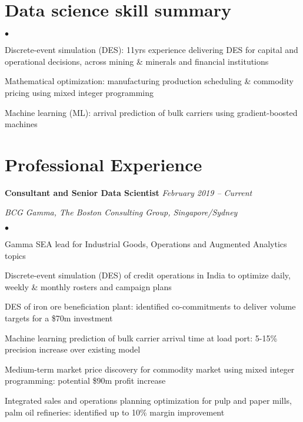 \documentclass[margin,line]{resume}
\newenvironment{list1}{
  \begin{list}{}{%
      \setlength{\itemsep}{0in}
      \setlength{\parsep}{0in} \setlength{\parskip}{0in}
      \setlength{\topsep}{0in} \setlength{\partopsep}{0in}
      \setlength{\leftmargin}{0.17in}}}{\end{list}}
\newenvironment{list2}{
  \begin{list}{$\bullet$}{%
      \setlength{\itemsep}{0in}
      \setlength{\parsep}{0in} \setlength{\parskip}{0in}
      \setlength{\topsep}{0in} \setlength{\partopsep}{0in}
      \setlength{\leftmargin}{0.2in}}}{\end{list}}
\begin{document}
\begin{resume}
\section{\sc Data science skill summary}
\begin{list2}
\item Discrete-event simulation (DES): 11yrs experience delivering DES for capital and operational decisions, across mining \& minerals and financial institutions
\item Mathematical optimization: manufacturing production scheduling \& commodity pricing using mixed integer programming
\item Machine learning (ML): arrival prediction of bulk carriers using gradient-boosted machines
\end{list2}

\section{\sc Professional Experience}
{\textbf{Consultant and Senior Data Scientist}} \hfill {\it February 2019 -- Current}\\
\vspace{-0.85\baselineskip}
\begin{list1}
\item {\it BCG Gamma, The Boston Consulting Group, Singapore/Sydney}
\begin{list2}
\item Gamma SEA lead for Industrial Goods, Operations and Augmented Analytics topics
\item Discrete-event simulation (DES) of credit operations in India to optimize daily, weekly \& monthly rosters and campaign plans
\item DES of iron ore beneficiation plant: identified co-commitments to deliver volume targets for a \$70m investment 
\item Machine learning prediction of bulk carrier arrival time at load port: 5-15\% precision increase over existing model
\item Medium-term market price discovery for commodity market using mixed integer programming: potential \$90m profit increase
\item Integrated sales and operations planning optimization for pulp and paper mills, palm oil refineries: identified up to 10\% margin improvement 
\end{list2}
\end{list1}



\end{resume}
\end{document}
